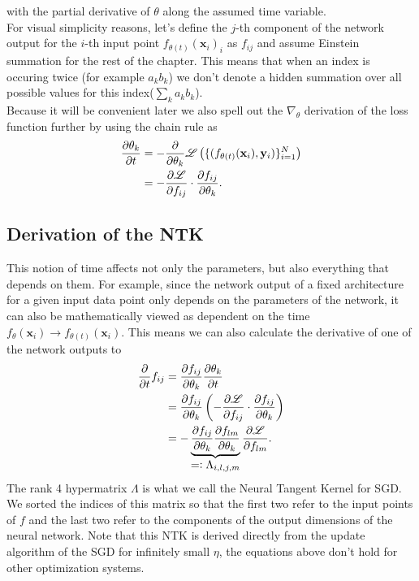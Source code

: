 with the partial derivative of $\theta$ along the assumed time variable.\\
For visual simplicity reasons, let's define the $j$-th component of the network output for the $i$-th input point $f_{\theta(t)}(\mathbf{x}_i)_i$ as $f_{ij}$ and assume Einstein summation for the rest of the chapter. This means that when an index is occuring twice (for example $a_k b_k$) we don't denote a hidden summation over all possible values for this index($\sum_k a_kb_k$).\\ 
Because it will be convenient later we also spell out the $\nabla_\theta$ derivation of the loss function further by using the chain rule as
\begin{align}
	\frac{\partial\theta_k}{\partial t} &= - \frac{\partial}{\partial\theta_k}\mathscr{L}\left( \{(f_{\theta(t)}(\mathbf{x}_i), \mathbf{y}_i)\}_{i=1}^{N} \right)\nonumber\\
	&= - \frac{\partial\mathscr{L}}{\partial f_{ij}} \cdot \frac{\partial f_{ij}}{\partial\theta_k}.
\end{align} 

\subsection{Derivation of the NTK}
This notion of time affects not only the parameters, but also everything that depends on them. For example, since the network output of a fixed architecture for a given input data point only depends on the parameters of the network, it can also be mathematically viewed as dependent on the time $f_{\theta}(\mathbf{x}_i) \rightarrow f_{\theta(t)}(\mathbf{x}_i)$. This means we can also calculate the derivative of one of the network outputs to
\begin{align}
	\pAbl{}{t} f_{ij} &= \pAbl{f_{ij}}{\theta_k}\pAbl{\theta_k}{t}\nonumber\\
	&= \pAbl{f_{ij}}{\theta_k} \left(- \pAbl{\mathscr{L}}{f_{ij}} \cdot \pAbl{f_{ij}}{\theta_k} \right)\label{eq:NTKarisesFromHere}\\
	&= - \underbrace{\pAbl{f_{ij}}{\theta_k} \pAbl{f_{lm}}{\theta_k}}_\mathlarger{=\vcentcolon \Lambda_{i,l,j,m}}
	\pAbl{\mathscr{L}}{f_{lm}}.\nonumber
\end{align}
The rank 4 hypermatrix $\Lambda$ is what we call the Neural Tangent Kernel for SGD. We sorted the indices of this matrix so that the first two refer to the input points of $f$ and the last two refer to the components of the output dimensions of the neural network. Note that this NTK is derived directly from the update algorithm of the SGD for infinitely small $\eta$, the equations above don't hold for other optimization systems.